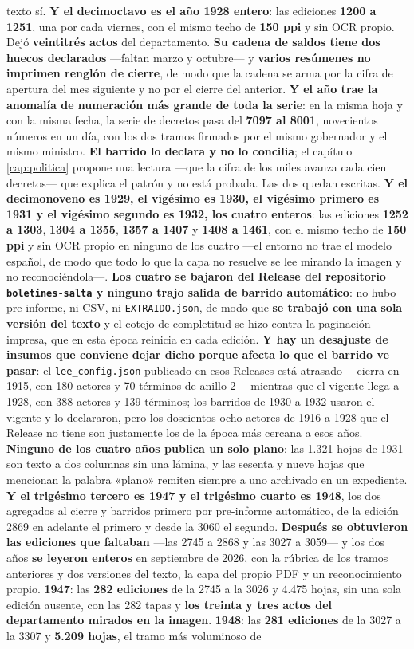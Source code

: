 texto sí. \textbf{Y el decimoctavo es el año 1928 entero}: las ediciones \textbf{1200 a 1251}, una por cada viernes, con el mismo techo de \textbf{150 ppi} y sin OCR propio. Dejó \textbf{veintitrés actos} del departamento. \textbf{Su cadena de saldos tiene dos huecos declarados} ---faltan marzo y octubre--- y \textbf{varios resúmenes no imprimen renglón de cierre}, de modo que la cadena se arma por la cifra de apertura del mes siguiente y no por el cierre del anterior. \textbf{Y el año trae la anomalía de numeración más grande de toda la serie}: en la misma hoja y con la misma fecha, la serie de decretos pasa del \textbf{7097 al 8001}, novecientos números en un día, con los dos tramos firmados por el mismo gobernador y el mismo ministro. \textbf{El barrido lo declara y no lo concilia}; el capítulo \ref{cap:politica} propone una lectura ---que la cifra de los miles avanza cada cien decretos--- que explica el patrón y no está probada. Las dos quedan escritas. \textbf{Y el decimonoveno es 1929, el vigésimo es 1930, el vigésimo primero es 1931 y el vigésimo segundo es 1932, los cuatro enteros}: las ediciones \textbf{1252 a 1303}, \textbf{1304 a 1355}, \textbf{1357 a 1407} y \textbf{1408 a 1461}, con el mismo techo de \textbf{150 ppi} y sin OCR propio en ninguno de los cuatro ---el entorno no trae el modelo español, de modo que todo lo que la capa no resuelve se lee mirando la imagen y no reconociéndola---. \textbf{Los cuatro se bajaron del Release del repositorio \texttt{boletines-salta} y ninguno trajo salida de barrido automático}: no hubo pre-informe, ni CSV, ni \texttt{EXTRAIDO.json}, de modo que \textbf{se trabajó con una sola versión del texto} y el cotejo de completitud se hizo contra la paginación impresa, que en esta época reinicia en cada edición. \textbf{Y hay un desajuste de insumos que conviene dejar dicho porque afecta lo que el barrido ve pasar}: el \texttt{lee\_config.json} publicado en esos Releases está atrasado ---cierra en 1915, con 180 actores y 70 términos de anillo 2--- mientras que el vigente llega a 1928, con 388 actores y 139 términos; los barridos de 1930 a 1932 usaron el vigente y lo declararon, pero los doscientos ocho actores de 1916 a 1928 que el Release no tiene son justamente los de la época más cercana a esos años. \textbf{Ninguno de los cuatro años publica un solo plano}: las 1.321 hojas de 1931 son texto a dos columnas sin una lámina, y las sesenta y nueve hojas que mencionan la palabra «plano» remiten siempre a uno archivado en un expediente. \textbf{Y el trigésimo tercero es 1947 y el trigésimo cuarto es 1948}, los dos agregados al cierre y barridos primero por pre-informe automático, de la edición 2869 en adelante el primero y desde la 3060 el segundo. \textbf{Después se obtuvieron las ediciones que faltaban} ---las 2745 a 2868 y las 3027 a 3059--- y los dos años \textbf{se leyeron enteros} en septiembre de 2026, con la rúbrica de los tramos anteriores y dos versiones del texto, la capa del propio PDF y un reconocimiento propio. \textbf{1947}: las \textbf{282 ediciones} de la 2745 a la 3026 y 4.475 hojas, sin una sola edición ausente, con las 282 tapas y \textbf{los treinta y tres actos del departamento mirados en la imagen}. \textbf{1948}: las \textbf{281 ediciones} de la 3027 a la 3307 y \textbf{5.209 hojas}, el tramo más voluminoso de 